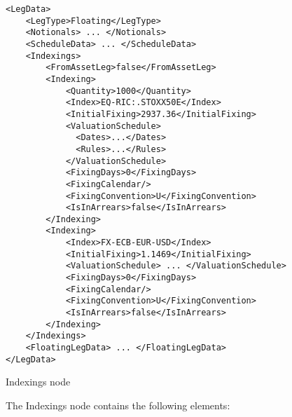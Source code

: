 \begin{listing}[H]
\begin{verbatim}
<LegData>
    <LegType>Floating</LegType>
    <Notionals> ... </Notionals>
    <ScheduleData> ... </ScheduleData>
    <Indexings>
        <FromAssetLeg>false</FromAssetLeg>
        <Indexing>
            <Quantity>1000</Quantity>
            <Index>EQ-RIC:.STOXX50E</Index>
            <InitialFixing>2937.36</InitialFixing>
            <ValuationSchedule>
              <Dates>...</Dates>
              <Rules>...</Rules>
            </ValuationSchedule>
            <FixingDays>0</FixingDays>
            <FixingCalendar/>
            <FixingConvention>U</FixingConvention>
            <IsInArrears>false</IsInArrears>
        </Indexing>
        <Indexing>
            <Index>FX-ECB-EUR-USD</Index>
            <InitialFixing>1.1469</InitialFixing>
            <ValuationSchedule> ... </ValuationSchedule>
            <FixingDays>0</FixingDays>
            <FixingCalendar/>
            <FixingConvention>U</FixingConvention>
            <IsInArrears>false</IsInArrears>
        </Indexing>
    </Indexings>
    <FloatingLegData> ... </FloatingLegData>
</LegData>
\end{verbatim}
\caption{Indexings node}
\label{lst:indexings}
\end{listing}

The Indexings node contains the following elements:

